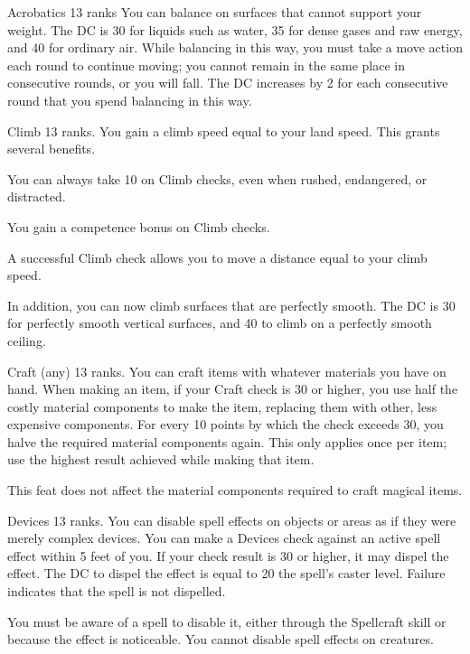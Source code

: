 \featpre Acrobatics 13 ranks
\featben You can balance on surfaces that cannot support your weight. The DC is 30 for liquids such as water, 35 for dense gases and raw energy, and 40 for ordinary air. While balancing in this way, you must take a move action each round to continue moving; you cannot remain in the same place in consecutive rounds, or you will fall. The DC increases by 2 for each consecutive round that you spend balancing in this way.

\featpre Climb 13 ranks.
\featben You gain a climb speed equal to your land speed. This grants several benefits. 
\begin{itemize*}
  \item You can always take 10 on Climb checks, even when rushed, endangered, or distracted. 
  \item You gain a  competence bonus on Climb checks.
  \item A successful Climb check allows you to move a distance equal to your climb speed.
\end{itemize*}

In addition, you can now climb surfaces that are perfectly smooth. The DC is 30 for perfectly smooth vertical surfaces, and 40 to climb on a perfectly smooth ceiling.

\featpre Craft (any) 13 ranks.
\featben You can craft items with whatever materials you have on hand. When making an item, if your Craft check is 30 or higher, you use half the costly material components to make the item, replacing them with other, less expensive components. For every 10 points by which the check exceeds 30, you halve the required material components again. This only applies once per item; use the highest result achieved while making that item.

This feat does not affect the material components required to craft magical items.

\featpre Devices 13 ranks.
\featben You can disable spell effects on objects or areas as if they were merely complex devices. You can make a Devices check against an active spell effect within 5 feet of you. If your check result is 30 or higher, it may dispel the effect. The DC to dispel the effect is equal to 20 \add the spell's caster level. Failure indicates that the spell is not dispelled. 

You must be aware of a spell to disable it, either through the Spellcraft skill or because the effect is noticeable. You cannot disable spell effects on creatures.

